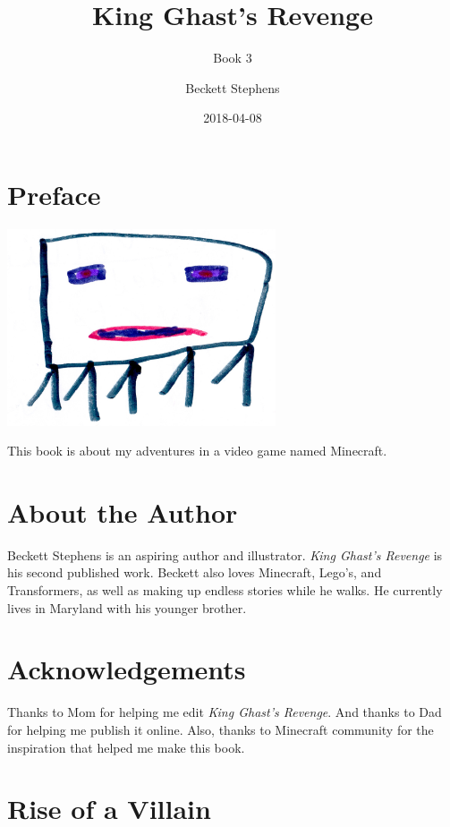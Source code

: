 \documentclass[oneside]{book}
\title{King Ghast's Revenge}
\subtitle{Book 3}
\author{Beckett Stephens}
\date{2018-04-08}
\begin{document}
\maketitle

{
\setcounter{tocdepth}{1}
\tableofcontents
}
\chapter*{Preface}\label{preface}

\includegraphics[width=3.12500in]{img/00-ghast.jpg}

This book is about my adventures in a video game named Minecraft.

\chapter*{About the Author}\label{about-the-author}

Beckett Stephens is an aspiring author and illustrator. \emph{King
Ghast's Revenge} is his second published work. Beckett also loves
Minecraft, Lego's, and Transformers, as well as making up endless
stories while he walks. He currently lives in Maryland with his younger
brother.

\chapter*{Acknowledgements}\label{acknowledgements}

Thanks to Mom for helping me edit \emph{King Ghast's Revenge}. And
thanks to Dad for helping me publish it online. Also, thanks to
Minecraft community for the inspiration that helped me make this book.

\chapter{Rise of a Villain}\label{rise-of-a-villain}
\end{document}

